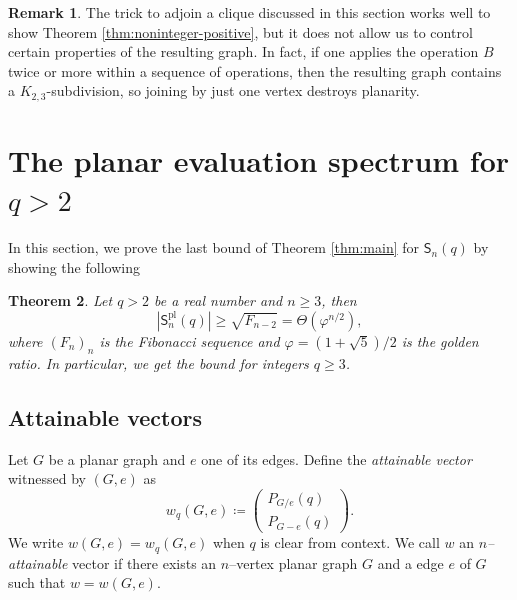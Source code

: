 \documentclass[A4paper,reqno,oneside,12pt]{amsart}
\theoremstyle{plain}
\newtheorem{theorem}{Theorem}[section]
\theoremstyle{definition}
\newtheorem{remark}[theorem]{Remark}
\newcommand{\abs}[1]{\left| #1 \right|}
\DeclareMathOperator{\pl}{\mathrm{pl}}
\begin{document}
\begin{remark}
The trick to adjoin a clique discussed in this section works well to show Theorem \ref{thm:noninteger-positive}, but it does not allow us to control certain properties of the resulting graph. In fact, if one applies the operation $B$ twice or more within a sequence of operations, then the resulting graph contains a $K_{2,3}$-subdivision, so joining by just one vertex destroys planarity.   
    \end{remark}

\section{The planar evaluation spectrum for \texorpdfstring{$q > 2$}{q > 2}}\label{sec:integers}

In this section, we prove the last bound of Theorem \ref{thm:main} for $\mathsf{S}_n(q)$ by showing the following
\begin{theorem}\label{thm:q_greater_than_2}
    Let $q > 2$ be a real number and $n \geq 3$, then
    \[\abs{\mathsf{S}^{\pl}_n(q)} \geq \sqrt{F_{n-2}} =\Theta(\varphi^{n/2}),\]
    where $(F_n)_n$ is the Fibonacci sequence and $\varphi = (1+\sqrt{5})/2$ is the golden ratio. In particular, we get the bound for integers $q \geq 3$.
\end{theorem}


\subsection{Attainable vectors}
\label{sec:attainable_int}
Let $G$ be a planar graph and $e$ one of its edges. Define the \emph{attainable vector} witnessed by $(G,e)$ as
\[
w_q{(G,e)} \coloneqq
\begin{pmatrix}
P_{G/e}(q)\\[2pt]
P_{G-e}(q)
\end{pmatrix}.
\]
We write $w(G,e) = w_q(G,e)$ when $q$ is clear from context.
We call $w$ an \emph{$n$--attainable} vector if there exists an $n$--vertex planar graph $G$ and a edge $e$ of $G$ such that $w = w(G,e)$. 
\end{document}

